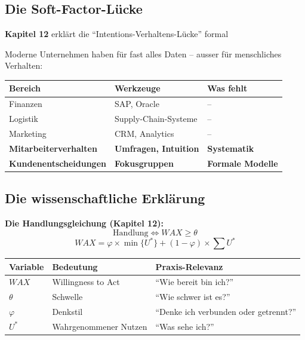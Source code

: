 \documentclass[11pt,a4paper]{article}
\begin{document}
\subsection{Die Soft-Factor-Lücke}

\begin{ebfbox}
\textbf{Kapitel 12} erklärt die ``Intentions-Verhaltens-Lücke'' formal
\end{ebfbox}

Moderne Unternehmen haben für fast alles Daten -- ausser für menschliches Verhalten:

\begin{center}
\begin{tabular}{lll}
\toprule
\textbf{Bereich} & \textbf{Werkzeuge} & \textbf{Was fehlt} \\
\midrule
Finanzen & SAP, Oracle & -- \\
Logistik & Supply-Chain-Systeme & -- \\
Marketing & CRM, Analytics & -- \\
\textbf{Mitarbeiterverhalten} & \textbf{Umfragen, Intuition} & \textbf{Systematik} \\
\textbf{Kundenentscheidungen} & \textbf{Fokusgruppen} & \textbf{Formale Modelle} \\
\bottomrule
\end{tabular}
\end{center}

\subsection{Die wissenschaftliche Erklärung}

\begin{formulabox}
\textbf{Die Handlungsgleichung (Kapitel 12):}
\begin{equation}
\text{Handlung} \Leftrightarrow WAX \geq \theta
\end{equation}
\begin{equation}
WAX = \varphi \times \min\{U^*\} + (1-\varphi) \times \sum U^*
\end{equation}
\end{formulabox}

\begin{center}
\begin{tabular}{lll}
\toprule
\textbf{Variable} & \textbf{Bedeutung} & \textbf{Praxis-Relevanz} \\
\midrule
$WAX$ & Willingness to Act & ``Wie bereit bin ich?'' \\
$\theta$ & Schwelle & ``Wie schwer ist es?'' \\
$\varphi$ & Denkstil & ``Denke ich verbunden oder getrennt?'' \\
$U^*$ & Wahrgenommener Nutzen & ``Was sehe ich?'' \\
\bottomrule
\end{tabular}
\end{center}
\end{document}
